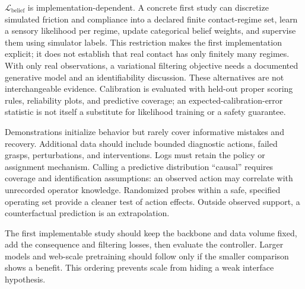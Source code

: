 \documentclass[11pt]{article}
\begin{document}
$\mathcal L_{\mathrm{belief}}$ is implementation-dependent. A concrete first study can discretize simulated friction and compliance into a declared finite contact-regime set, learn a sensory likelihood per regime, update categorical belief weights, and supervise them using simulator labels. This restriction makes the first implementation explicit; it does not establish that real contact has only finitely many regimes. With only real observations, a variational filtering objective needs a documented generative model and an identifiability discussion. These alternatives are not interchangeable evidence. Calibration is evaluated with held-out proper scoring rules, reliability plots, and predictive coverage; an expected-calibration-error statistic is not itself a substitute for likelihood training or a safety guarantee.

Demonstrations initialize behavior but rarely cover informative mistakes and recovery. Additional data should include bounded diagnostic actions, failed grasps, perturbations, and interventions. Logs must retain the policy or assignment mechanism. Calling a predictive distribution ``causal'' requires coverage and identification assumptions: an observed action may correlate with unrecorded operator knowledge. Randomized probes within a safe, specified operating set provide a cleaner test of action effects. Outside observed support, a counterfactual prediction is an extrapolation.

The first implementable study should keep the backbone and data volume fixed, add the consequence and filtering losses, then evaluate the controller. Larger models and web-scale pretraining should follow only if the smaller comparison shows a benefit. This ordering prevents scale from hiding a weak interface hypothesis.
\end{document}
